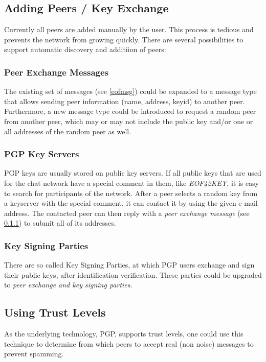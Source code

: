 \subsection{Adding Peers / Key Exchange}
\label{keyexchange}
Currently all peers are added manually by the user. 
This process is tedious and prevents the network from growing quickly.
There are several possibilities to support automatic discovery and
additiion of peers:
\subsubsection{Peer Exchange Messages}
\label{peerexchange}
The existing set of messages (see \ref{eofmsg}) could be expanded to a message
type that allows sending peer information (name, address, keyid) to another
peer. Furthermore, a new message type could be introduced to request a random
peer from another peer, which may or may not include the public key 
and/or one or all addresses of the random peer as well.
\subsubsection{PGP Key Servers}
PGP keys are usually stored on public key servers.
If all public keys that are used for the chat network have a special comment
in them, like \textit{EOF42KEY}, it is easy to search for participants of the
network. After a peer selects a random key from a keyserver with the
special comment, it can contact it by using the given e-mail address.
The contacted peer can then reply with a \textit{peer exchange message}
(see \ref{peerexchange}) to submit all of its addresses.
\subsubsection{Key Signing Parties}
There are so called Key Signing Parties, at which PGP users exchange and
sign their public keys, after identification verification.
These parties could be upgraded to \textit{peer exchange and key signing
parties}.
\subsection{Using Trust Levels}
As the underlying technology, PGP, supports trust levels, one could use this
technique to determine from which peers to accept real (non noise)
messages to prevent spamming.
